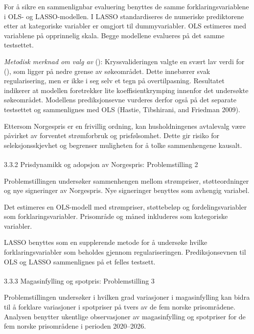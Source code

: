 \documentclass[
  letterpaper,
  DIV=11,
  numbers=noendperiod]{scrartcl}
\makeatletter
\let\oldparagraph\paragraph
\renewcommand{\paragraph}{
    \@ifstar
      \xxxParagraphStar
      \xxxParagraphNoStar
  }
\newcommand{\xxxParagraphStar}[1]{\oldparagraph*{#1}\mbox{}}
\newcommand{\xxxParagraphNoStar}[1]{\oldparagraph{#1}\mbox{}}
\makeatother
\begin{document}
For å sikre en sammenlignbar evaluering benyttes de samme
forklaringsvariablene i OLS- og LASSO-modellen. I LASSO standardiseres
de numeriske prediktorene etter at kategoriske variabler er omgjort til
dummyvariabler. OLS estimeres med variablene på opprinnelig skala. Begge
modellene evalueres på det samme testsettet.

\emph{Metodisk merknad om valg av} (\lambda): Kryssvalideringen valgte
en svært lav verdi for (\lambda), som ligger på nedre grense av
søkeområdet. Dette innebærer svak regularisering, men er ikke i seg selv
et tegn på overtilpasning. Resultatet indikerer at modellen foretrekker
lite koeffisientkrymping innenfor det undersøkte søkeområdet. Modellens
prediksjonsevne vurderes derfor også på det separate testsettet og
sammenlignes med OLS (Hastie, Tibshirani, and Friedman 2009).

Ettersom Norgespris er en frivillig ordning, kan husholdningenes
avtalevalg være påvirket av forventet strømforbruk og prisfølsomhet.
Dette gir risiko for seleksjonsskjevhet og begrenser muligheten for å
tolke sammenhengene kausalt.

\paragraph{3.3.2 Prisdynamikk og adopsjon av Norgespris: Problemstilling
2}\label{prisdynamikk-og-adopsjon-av-norgespris-problemstilling-2}

Problemstillingen undersøker sammenhengen mellom strømpriser,
støtteordninger og nye signeringer av Norgespris. Nye signeringer
benyttes som avhengig variabel.

Det estimeres en OLS-modell med strømpriser, støttebeløp og
fordelingsvariabler som forklaringsvariabler. Prisområde og måned
inkluderes som kategoriske variabler.

LASSO benyttes som en supplerende metode for å undersøke hvilke
forklaringsvariabler som beholdes gjennom regulariseringen.
Prediksjonsevnen til OLS og LASSO sammenlignes på et felles testsett.

\paragraph{3.3.3 Magasinfylling og spotpris: Problemstilling
3}\label{magasinfylling-og-spotpris-problemstilling-3}

Problemstillingen undersøker i hvilken grad variasjoner i magasinfylling
kan bidra til å forklare variasjoner i spotpriser på tvers av de fem
norske prisområdene. Analysen benytter ukentlige observasjoner av
magasinfylling og spotpriser for de fem norske prisområdene i perioden
2020--2026.
\end{document}
